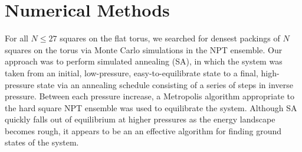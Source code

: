 \section{Numerical Methods}
\label{sec:numerical}

For all $N \leq 27$ squares on the flat torus, we searched for densest packings of $N$ squares on the torus via Monte Carlo simulations in the NPT ensemble.  Our approach was to perform simulated annealing (SA), in which the system was taken from an initial, low-pressure, easy-to-equilibrate state to a final, high-pressure state via an annealing schedule consisting of a series of steps in inverse pressure.  Between each pressure increase, a Metropolis algorithm appropriate to the hard square NPT ensemble was used to equilibrate the system.  Although SA quickly falls out of equilibrium at higher pressures as the energy landscape becomes rough, it appears to be an an effective algorithm for finding ground states of the system.  



